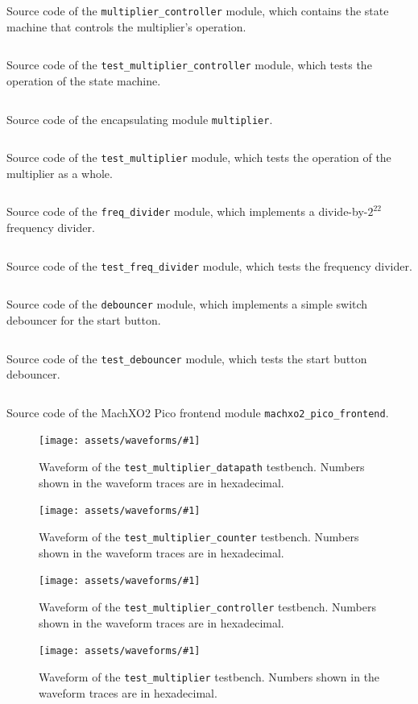 \documentclass[a4paper]{article}
\newcommand{\modulelisting}[3]{
  \begin{listing}[tbp]
    \linespread{.9}\inputminted[fontsize=\scriptsize,linenos]{systemverilog}{#2}
    \caption{#3}
    \label{lst:#1}
  \end{listing}
}
\newcommand{\waveformfigure}[2]{
  \begin{figure}[tbp]
    \centering\texttt{[image: assets/waveforms/\#1]}
    \caption{#2}
    \label{fig:wave:#1}
  \end{figure}
}
\begin{document}
\modulelisting{multiplier_controller}{../src/multiplier/multiplier_controller.sv}
  {Source code of the \texttt{multiplier\_controller} module, which contains the state machine that controls the multiplier's operation.}

\modulelisting{test_multiplier_controller}{../src/multiplier/test/test_multiplier_controller.sv}
  {Source code of the \texttt{test\_multiplier\_controller} module, which tests the operation of the state machine.}

\modulelisting{multiplier}{../src/multiplier/multiplier.sv}
  {Source code of the encapsulating module \texttt{multiplier}.}

\modulelisting{test_multiplier}{../src/multiplier/test/test_multiplier.sv}
  {Source code of the \texttt{test\_multiplier} module, which tests the operation of the multiplier as a whole.}

\modulelisting{freq_divider}{../src/util/freq_divider.sv}
  {Source code of the \texttt{freq\_divider} module, which implements a divide-by-$2^{22}$ frequency divider.}

\modulelisting{test_freq_divider}{../src/util/test/test_freq_divider.sv}
  {Source code of the \texttt{test\_freq\_divider} module, which tests the frequency divider.}

\modulelisting{debouncer}{../src/util/debouncer.sv}
  {Source code of the \texttt{debouncer} module, which implements a simple switch debouncer for the start button.}

\modulelisting{test_debouncer}{../src/util/test/test_debouncer.sv}
  {Source code of the \texttt{test\_debouncer} module, which tests the start button debouncer.}

\modulelisting{machxo2_pico_frontend}{../src/frontends/machxo2_pico_frontend.sv}
  {Source code of the MachXO2 Pico frontend module \texttt{machxo2\_pico\_frontend}.}

\waveformfigure{test_multiplier_datapath}{Waveform of the \texttt{test\_multiplier\_datapath} testbench. Numbers shown in the waveform traces are in hexadecimal.}

\waveformfigure{test_multiplier_counter}{Waveform of the \texttt{test\_multiplier\_counter} testbench. Numbers shown in the waveform traces are in hexadecimal.}

\waveformfigure{test_multiplier_controller}{Waveform of the \texttt{test\_multiplier\_controller} testbench. Numbers shown in the waveform traces are in hexadecimal.}

\waveformfigure{test_multiplier}{Waveform of the \texttt{test\_multiplier} testbench. Numbers shown in the waveform traces are in hexadecimal.}
\end{document}
